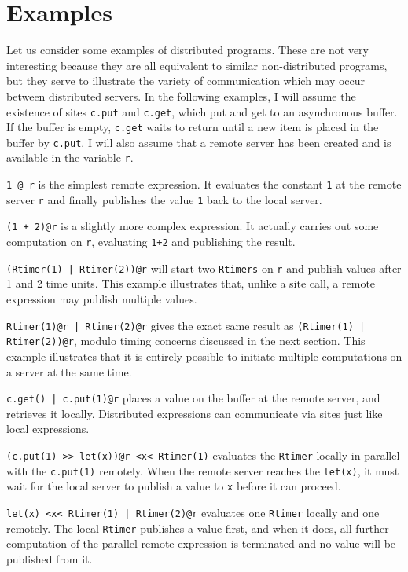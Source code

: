 \documentclass[10pt,letterpaper]{article}
\begin{document}
\section{Examples}

Let us consider some examples of distributed programs. These are not very
interesting because they are all equivalent to similar non-distributed
programs, but they serve to illustrate the variety of communication which may
occur between distributed servers.  In the following examples, I will assume
the existence of sites \texttt{c.put} and \texttt{c.get}, which put and get to
an asynchronous buffer. If the buffer is empty, \texttt{c.get} waits to return
until a new item is placed in the buffer by \texttt{c.put}. I will also assume
that a remote server has been created and is available in the variable
\texttt{r}.

\texttt{1 @ r} is the simplest remote expression. It evaluates the constant
\texttt{1} at the remote server \texttt{r} and finally publishes the value
\texttt{1} back to the local server.

\texttt{(1 + 2)@r} is a slightly more complex expression. It actually carries
out some computation on \texttt{r}, evaluating \texttt{1+2} and publishing the
result.

\texttt{(Rtimer(1) | Rtimer(2))@r} will start two \texttt{Rtimers} on
\texttt{r} and publish values after 1 and 2 time units. This example
illustrates that, unlike a site call, a remote expression may publish multiple
values.

\texttt{Rtimer(1)@r | Rtimer(2)@r} gives the exact same result as
\texttt{(Rtimer(1) | Rtimer(2))@r}, modulo timing concerns discussed in the
next section. This example illustrates that it is entirely possible to initiate
multiple computations on a server at the same time.

\texttt{c.get() | c.put(1)@r} places a value on the buffer at the remote
server, and retrieves it locally. Distributed expressions can communicate via
sites just like local expressions.

\texttt{(c.put(1) >> let(x))@r <x< Rtimer(1)} evaluates the \texttt{Rtimer}
locally in parallel with the \texttt{c.put(1)} remotely. When the remote
server reaches the \texttt{let(x)}, it must wait for the local server to
publish a value to \texttt{x} before it can proceed.

\texttt{let(x) <x< Rtimer(1) | Rtimer(2)@r} evaluates one \texttt{Rtimer}
locally and one remotely. The local \texttt{Rtimer} publishes a value first,
and when it does, all further computation of the parallel remote expression is
terminated and no value will be published from it.
\end{document}
